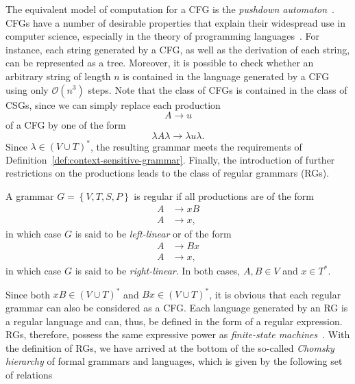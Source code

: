 The equivalent model of computation for a CFG is the \emph{pushdown automaton}~\cite{linz2006introduction}.  
CFGs have a number of desirable properties that explain their widespread use in computer science, especially in the theory of programming languages~\cite{pierce2002types}.
For instance, each string generated by a CFG, as well as the derivation of each string, can be represented as a tree.
Moreover, it is possible to check whether an arbitrary string of length $n$ is contained in the language generated by a CFG using only $\mathcal{O}(n^3)$ steps.
Note that the class of CFGs is contained in the class of CSGs, since we can simply replace each production 
\begin{equation}
	A \to u
\end{equation}
of a CFG by one of the form
\begin{equation}
	\lambda A \lambda \to \lambda u \lambda.
\end{equation} 
Since $\lambda \in \left(V \cup T\right)^*$, the resulting grammar meets the requirements of Definition~\ref{def:context-sensitive-grammar}.
Finally, the introduction of further restrictions on the productions leads to the class of regular grammars (RGs).
\begin{definition}
	A grammar $G = \left\{V, T, S, P\right\}$ is regular if all productions are of the form
	\begin{equation*}
		\begin{split}
			A & \to xB \\
			A & \to x,
		\end{split}
	\end{equation*}
in which case $G$ is said to be \emph{left-linear} or of the form
	\begin{equation*}
	\begin{split}
		A & \to Bx \\
		A & \to x,
	\end{split}
	\end{equation*}
in which case $G$ is said to be \emph{right-linear}. In both cases, $A, B \in V$ and $x \in T^*$.
\end{definition}
Since both $xB \in \left(V \cup T\right)^*$ and $Bx \in \left(V \cup T\right)^*$, it is obvious that each regular grammar can also be considered as a CFG.
Each language generated by an RG is a regular language and can, thus, be defined in the form of a regular expression. 
RGs, therefore, possess the same expressive power as \emph{finite-state machines}~\cite{linz2006introduction}.
With the definition of RGs, we have arrived at the bottom of the so-called \emph{Chomsky hierarchy} of formal grammars and languages, which is given by the following set of relations
